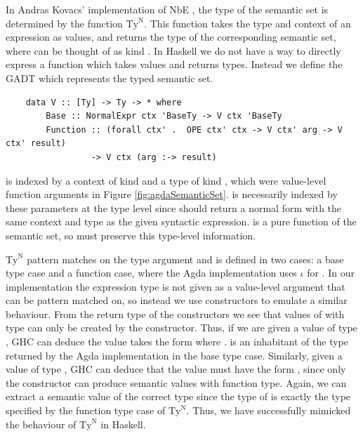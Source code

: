 In Andras Kovacs' implementation of NbE \cite{AgdaNbe}, the type of the semantic set is determined by the function $\text{Ty}^\text{N}$. This function takes the type and context of an expression as values, and returns the type of the corresponding semantic set, where  can be thought of as kind \code{*}. In Haskell we do not have a way to directly express a function which takes values and returns types. Instead we define the GADT  which represents the typed semantic set.

\begin{lstlisting}
    data V :: [Ty] -> Ty -> * where 
        Base :: NormalExpr ctx 'BaseTy -> V ctx 'BaseTy
        Function :: (forall ctx' .  OPE ctx' ctx -> V ctx' arg -> V ctx' result) 
                 -> V ctx (arg :-> result)
\end{lstlisting}

 is indexed by a context of kind \code{[Ty]} and a type of kind , which were value-level function arguments in Figure \ref{fig:agdaSemanticSet}.  is necessarily indexed by these parameters at the type level since  should return a normal form with the same context and type as the given syntactic expression.  is a pure function of the semantic set, so  must preserve this type-level information. 

$\text{Ty}^\text{N}$ pattern matches on the type argument and is defined in two cases: a base type case and a function case, where the Agda implementation uses $\iota$ for . In our implementation the expression type is not given as a value-level argument that can be pattern matched on, so instead we use constructors to emulate a similar behaviour. From the return type of the constructors we see that values of  with type  can only be created by the  constructor. Thus, if we are given a value of type , GHC can deduce the value takes the form  where .  is an inhabitant of the type returned by the Agda implementation in the base type case. 
Similarly, given a value of type , GHC can deduce that the value must have the form , since only the  constructor can produce semantic values with function type. Again, we can extract a semantic value of the correct type since the type of  is exactly the type specified by the function type case of $\text{Ty}^\text{N}$. Thus, we have successfully mimicked the behaviour of $\text{Ty}^\text{N}$ in Haskell.

